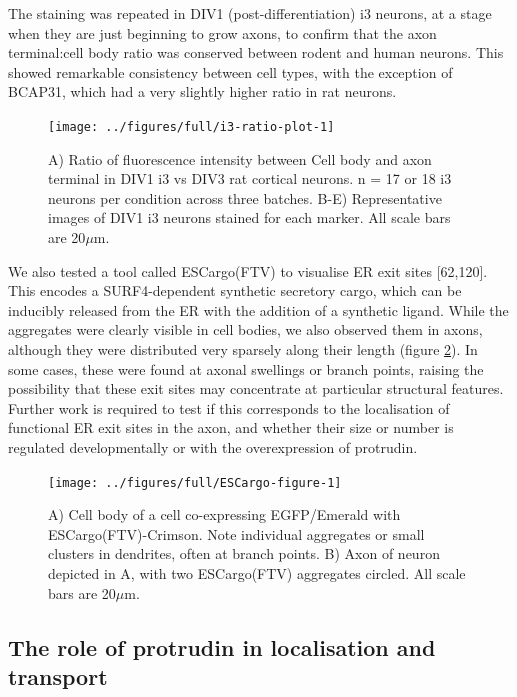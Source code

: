 \documentclass[
  12pt,
  a4paper,
]{book}
\begin{document}
The staining was repeated in DIV1 (post-differentiation) i3 neurons, at a stage when they are just beginning to grow axons, to confirm that the axon terminal:cell body ratio was conserved between rodent and human neurons. This showed remarkable consistency between cell types, with the exception of BCAP31, which had a very slightly higher ratio in rat neurons.

\begin{figure}
\texttt{[image: ../figures/full/i3-ratio-plot-1]} \caption[Comparison of marker localisation between i3 neurons and rat cortical neurons]{A) Ratio of fluorescence intensity between Cell body and axon terminal in DIV1 i3 vs DIV3 rat cortical neurons.  n = 17 or 18 i3 neurons per condition across three batches. B-E) Representative images of DIV1 i3 neurons stained for each marker.  All scale bars are 20$\mu$m.}\label{fig:i3-ratio-plot}
\end{figure}

We also tested a tool called ESCargo(FTV) to visualise ER exit sites {[}62,120{]}. This encodes a SURF4-dependent synthetic secretory cargo, which can be inducibly released from the ER with the addition of a synthetic ligand. While the aggregates were clearly visible in cell bodies, we also observed them in axons, although they were distributed very sparsely along their length (figure \ref{fig:ESCargo-figure}). In some cases, these were found at axonal swellings or branch points, raising the possibility that these exit sites may concentrate at particular structural features. Further work is required to test if this corresponds to the localisation of functional ER exit sites in the axon, and whether their size or number is regulated developmentally or with the overexpression of protrudin.

\begin{figure}
\texttt{[image: ../figures/full/ESCargo-figure-1]} \caption[ESCargo localisation in cortical neurons]{A) Cell body of a cell co-expressing EGFP/Emerald with ESCargo(FTV)-Crimson.  Note individual aggregates or small clusters in dendrites, often at branch points.  B) Axon of neuron depicted in A, with two ESCargo(FTV) aggregates circled.  All scale bars are 20$\mu$m.}\label{fig:ESCargo-figure}
\end{figure}

\hypertarget{the-role-of-protrudin-in-localisation-and-transport}{%
\subsection{The role of protrudin in localisation and transport}\label{the-role-of-protrudin-in-localisation-and-transport}}
\end{document}
